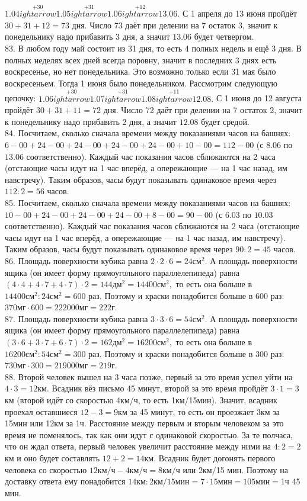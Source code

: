 $1.04\stackrel{+30}{
ightarrow}1.05\stackrel{+31}{
ightarrow}1.06\stackrel{+12}{
ightarrow}13.06.$ С 1 апреля до 13 июня пройдёт $30+31+12=73$ дня. Число 73 даёт при делении на 7 остаток 3, значит к понедельнику надо прибавить 3 дня, а значит $13.06$ будет четвергом.\\
83. В любом году май состоит из 31 дня, то есть 4 полных недель и ещё 3 дня. В полных неделях всех дней всегда поровну, значит в последних 3 днях есть воскресенье, но нет понедельника. Это возможно только если 31 мая было воскресеньем. Тогда 1 июня было понедельником. Рассмотрим следующую цепочку:
$1.06\stackrel{+30}{
ightarrow}1.07\stackrel{+31}{
ightarrow}1.08\stackrel{+11}{
ightarrow}12.08.$ С 1 июня до 12 августа пройдёт $30+31+11=72$ дня. Число 72 даёт при делении на 7 остаток 2, значит к понедельнику надо прибавить 2 дня, а значит $12.08$ будет средой.\\
84. Посчитаем, сколько сначала времени между показаниями часов на башнях: $6-00+24-00+24-00+24-00+24-00+10-00=112-00$ (с $8.06$ по $13.06$ соответственно). Каждый час показания часов сближаются на 2 часа (отстающие часы идут на 1 час вперёд, а опережающие --- на 1 час назад, им навстречу). Таким образов, часы будут показывать одинаковое время через $112:2=56$ часов.\\
85. Посчитаем, сколько сначала времени между показаниями часов на башнях: $10-00+24-00+24-00+24-00+8-00=90-00$ (с $6.03$ по $10.03$ соответственно). Каждый час показания часов сближаются на 2 часа (отстающие часы идут на 1 час вперёд, а опережающие --- на 1 час назад, им навстречу). Таким образов, часы будут показывать одинаковое время через $90:2=45$ часов.\\
86. Площадь поверхности кубика равна $2\cdot2\cdot6=24\text{см}^2.$ А площадь поверхности ящика (он имеет форму прямоугольного параллелепипеда) равна $(4\cdot4+4\cdot7+4\cdot7)\cdot2=144\text{дм}^2=14400\text{см}^2,$ то есть она больше в $14400\text{см}^2:24\text{см}^2=600$ раз. Поэтому и краски понадобится больше в 600 раз: $370\text{мг}\cdot600=222000\text{мг}=222$г.\\
87. Площадь поверхности кубика равна $3\cdot3\cdot6=54\text{см}^2.$ А площадь поверхности ящика (он имеет форму прямоугольного параллелепипеда) равна $(3\cdot6+3\cdot7+6\cdot7)\cdot2=162\text{дм}^2=16200\text{см}^2,$ то есть она больше в $16200\text{см}^2:54\text{см}^2=300$ раз. Поэтому и краски понадобится больше в 300 раз: $730\text{мг}\cdot300=219000\text{мг}=219$г.\\
88. Второй человек вышел на 3 часа позже, первый за это время успел уйти на $4\cdot3=12$км. Всадник вёз письмо 45 минут, второй за это время пройдёт $3\cdot1=3$км (второй идёт со скоростью 4км/ч, то есть 1км/15мин). Значит, всадник проехал оставшиеся $12-3=9$км за 45 минут, то есть он проезжает 3км за 15мин или 12км за 1ч. Расстояние между первым и вторым человеком за это время не поменялось, так как они идут с одинаковой скоростью. За те полчаса, что он ждал ответа, первый человек увеличит расстояние между ними на $4:2=2$км и оно будет составлять $12+2=14$км. Всадник будет догонять первого человека со скоростью $12\text{км/ч}-4\text{км/ч}=8\text{км/ч}$ или 2км/15 мин. Поэтому на доставку ответа ему понадобится $14\text{км}:2\text{км/15мин}=7\cdot15\text{мин}=105\text{мин}=$1ч 45 мин.\\
